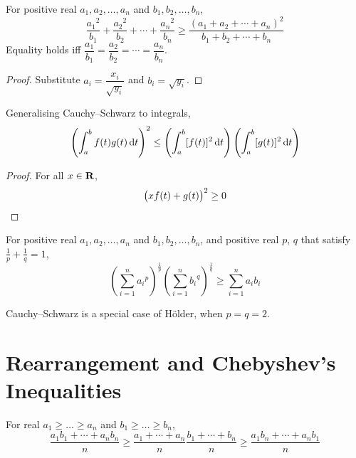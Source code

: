 \begin{theorem}
For positive real $a_1, a_2, \dots, a_n$ and $b_1, b_2, \dots, b_n$, 
\begin{equation}
\frac{{a_1}^2}{b_1}+\frac{{a_2}^2}{b_2}+\cdots+\frac{{a_n}^2}{b_n} \ge \frac{(a_1+a_2+\cdots+a_n)^2}{b_1+b_2+\cdots+b_n}
\end{equation} 
Equality holds iff $\dfrac{a_1}{b_1}=\dfrac{a_2}{b_2}=\cdots=\dfrac{a_n}{b_n}$. 
\end{theorem}

\begin{proof}
Substitute $a_i=\dfrac{x_i}{\sqrt{y_i}}$ and $b_i=\sqrt{y_i}$.
\end{proof}

Generalising Cauchy--Schwarz to integrals, 
\begin{equation}
\left(\int_a^bf(t)g(t)\dd{t}\right)^2\le\left(\int_a^b[f(t)]^2\dd{t}\right)\left(\int_a^b[g(t)]^2\dd{t}\right)
\end{equation}

\begin{proof}
For all $x\in\mathbf R$,
\begin{align*}
\left(xf(t)+g(t)\right)^2 &\ge 0 \\
\end{align*}
\end{proof}

\begin{theorem}
For positive real $a_1, a_2, \dots, a_n$ and $b_1, b_2, \dots, b_n$, and positive real $p$, $q$ that satisfy $\frac{1}{p}+\frac{1}{q}=1$, 
\begin{equation} 
\left(\sum_{i=1}^{n} {a_i}^p\right)^{\frac{1}{p}} \left(\sum_{i=1}^{n} {b_i}^q\right)^{\frac{1}{q}} \ge \sum_{i=1}^{n} a_ib_i 
\end{equation}
\end{theorem}

\begin{remark}
Cauchy--Schwarz is a special case of H\"{o}lder, when $p=q=2$.
\end{remark}

\section{Rearrangement and Chebyshev's Inequalities}
\begin{theorem}
For real $a_1\ge\dots\ge a_n$ and $b_1\ge\dots\ge b_n$,
\begin{equation}
\frac{a_1b_1+\cdots+a_nb_n}{n} \ge \frac{a_1+\cdots+a_n}{n} \frac{b_1+\cdots+b_n}{n}\ge\frac{a_1b_n+\cdots+a_nb_1}{n}
\end{equation}
\end{theorem}

